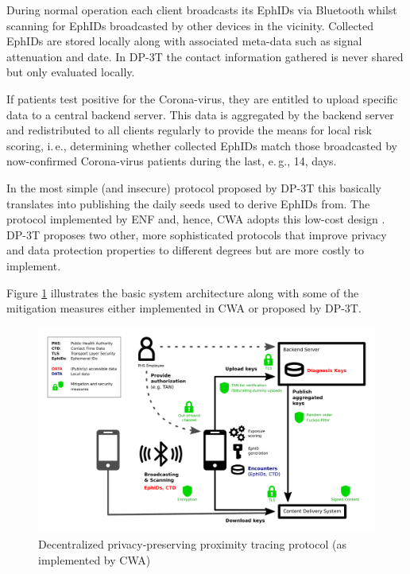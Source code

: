 \documentclass{llncs}
\begin{document}
During normal operation each client broadcasts its EphIDs via Bluetooth whilst scanning for
EphIDs broadcasted by other devices in the vicinity. Collected EphIDs are stored locally along
with associated meta-data such as signal attenuation and date. In DP-3T the contact information
gathered is never shared but only evaluated locally.

If patients test positive for the Corona-virus, they are entitled to upload specific data to a
central backend server. This data is aggregated by the backend server and redistributed to all
clients regularly to provide the means for local risk scoring, i.\,e., determining whether collected
EphIDs match those broadcasted by now-confirmed Corona-virus patients during the last, e.\,g., 14, 
days.

In the most simple (and insecure) protocol proposed by DP-3T %
this basically translates into publishing the daily seeds used to derive EphIDs from.
The protocol implemented by ENF and,
hence, CWA adopts this low-cost design \cite{cwa:arch}. DP-3T proposes two other, more sophisticated protocols that improve
privacy and data protection properties to different degrees but are more costly to implement.

Figure \ref{fig:dp3tprot} illustrates the basic system architecture
along with some of the mitigation measures either implemented in CWA or proposed by DP-3T.

\begin{figure}[htb]
  \begin{center}
    \includegraphics[width=5in]{DP-3T_basic_protocol}
  \end{center}
  \caption{Decentralized privacy-preserving proximity tracing protocol
    (as implemented by CWA)}
  \label{fig:dp3tprot}
\end{figure}
\end{document}
